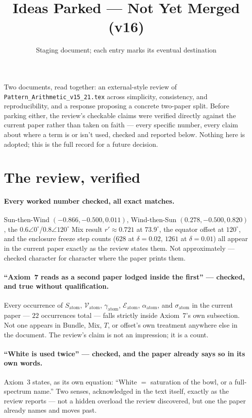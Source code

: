 \documentclass[11pt]{article}
\title{Ideas Parked --- Not Yet Merged (v16)}
\author{Staging document; each entry marks its eventual destination}
\date{}
\begin{document}
\maketitle

\noindent Two documents, read together: an external-style review of
\texttt{Pattern\_Arithmetic\_v15\_21.tex} across simplicity,
consistency, and reproducibility, and a response proposing a
concrete two-paper split. Before parking either, the review's
checkable claims were verified directly against the current paper
rather than taken on faith --- every specific number, every claim
about where a term is or isn't used, checked and reported below.
Nothing here is adopted; this is the full record for a future
decision.

\section{The review, verified}

\paragraph{Every worked number checked, all exact matches.}
Sun-then-Wind $(-0.866,-0.500,0.011)$, Wind-then-Sun
$(0.278,-0.500,0.820)$, the $0.6\angle0^\circ$/$0.8\angle120^\circ$
Mix result $r'\approx0.721$ at $73.9^\circ$, the equator offset at
$120^\circ$, and the enclosure freeze step counts ($628$ at
$\delta=0.02$, $1261$ at $\delta=0.01$) all appear in the current
paper exactly as the review states them. Not approximately ---
checked character for character where the paper prints them.

\paragraph{``Axiom~7 reads as a second paper lodged inside the
first'' --- checked, and true without qualification.} Every
occurrence of $S_{\text{atom}}$, $\mathcal{V}_{\text{atom}}$,
$\gamma_{\text{atom}}$, $\mathcal{E}_{\text{atom}}$,
$\alpha_{\text{atom}}$, and $\sigma_{\text{atom}}$ in the current
paper --- $22$ occurrences total --- falls strictly inside Axiom~7's
own subsection. Not one appears in Bundle, Mix, $T$, or offset's own
treatment anywhere else in the document. The review's claim is not
an impression; it is a count.

\paragraph{``White is used twice'' --- checked, and the paper already
says so in its own words.} Axiom~3 states, as its own equation:
``White $=$ saturation of the bowl, or a full-spectrum name.'' Two
senses, acknowledged in the text itself, exactly as the review
reports --- not a hidden overload the review discovered, but one the
paper already names and moves past.
\end{document}
